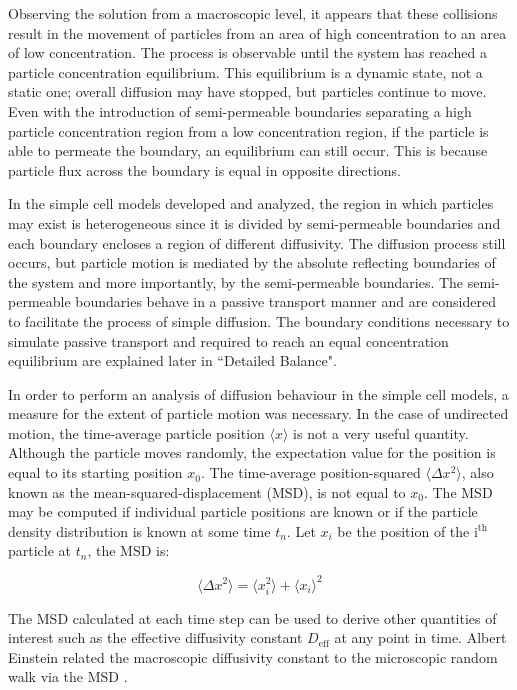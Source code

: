 	\newpage
	Observing the solution from a macroscopic level, it appears that these collisions result in the movement of particles from an area of high concentration to an area of low concentration. The process is observable until the system has reached a particle concentration equilibrium. This equilibrium is a dynamic state, not a static one; overall diffusion may have stopped, but particles continue to move.	Even with the introduction of semi-permeable boundaries separating a high particle concentration region from a low concentration region, if the particle is able to permeate the boundary, an equilibrium can still occur. This is because particle flux across the boundary is equal in opposite directions.
	
	In the simple cell models developed and analyzed, the region in which particles may exist is heterogeneous since it is divided by semi-permeable boundaries and each boundary encloses a region of different diffusivity. The diffusion process still occurs, but particle motion is mediated by the absolute reflecting boundaries of the system and more importantly, by the semi-permeable boundaries. The semi-permeable boundaries behave in a passive transport manner and are considered to facilitate the process of simple diffusion. The boundary conditions necessary to simulate passive transport and required to reach an equal concentration equilibrium are explained later in ``Detailed Balance".
	
	In order to perform an analysis of diffusion behaviour in the simple cell models, a measure for the extent of particle motion was necessary. In the case of undirected motion, the time-average particle position $ \langle x \rangle $ is not a very useful quantity. Although the particle moves randomly, the expectation value for the position is equal to its starting position $ x_0 $. The time-average position-squared $ \langle \Delta x^2 \rangle $, also known as the mean-squared-displacement (MSD), is not equal to $ x_0 $. The MSD may be computed if individual particle positions are known or if the particle density distribution is known at some time $ t_n $. Let $ x_i $ be the position of the $ \textrm{i}^\textrm{th} $ particle at $ t_n $, the MSD is:
		
	\begin{equation}
		\langle \Delta x^2 \rangle = \langle x_{i}^2 \rangle + \langle x_i \rangle^2
	\end{equation}
	
	The MSD calculated at each time step can be used to derive other quantities of interest such as the effective diffusivity constant $ D_\textrm{eff} $ at any point in time. Albert Einstein related the macroscopic diffusivity constant to the microscopic random walk via the MSD \citep{diffusion-1}.
	
